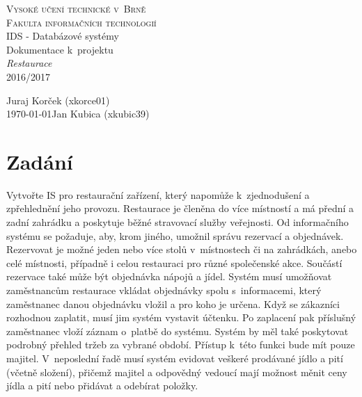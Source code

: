\documentclass[11pt, a4paper]{article}
\author{Jan Kubica, Juraj Korček}
\begin{document}
	\begin{titlepage}
		\begin{center}
			\textsc{\Huge Vysoké učení technické v~Brně} \\[8pt]
			\textsc{\huge Fakulta informačních technologií} \\[16pt]
			{\LARGE IDS - Databázové systémy} \\[6pt]
			{\huge Dokumentace k~projektu} \\
			{\Huge \emph{Restaurace}} \\
			{\Large 2016/2017}
		\end{center}
		
		{\Large \hfill Juraj Korček (xkorce01)} \\[8pt]
		{\Large \today \hfill Jan Kubica (xkubic39)}
		
	\end{titlepage}


\section{Zadání}

   Vytvořte IS pro restaurační zařízení, který napomůže k~zjednodušení a zpřehlednění
jeho provozu. Restaurace je členěna do více místností a má přední a zadní zahrádku
a poskytuje běžné stravovací služby veřejnosti. Od informačního systému se požaduje,
aby, krom jiného, umožnil správu rezervací a objednávek. Rezervovat je možné jeden
nebo více stolů v~místnostech či na zahrádkách, anebo celé místnosti, případně i celou
restauraci pro různé společenské akce. Součástí rezervace také může být objednávka
nápojů a jídel. Systém musí umožňovat zaměstnancům restaurace vkládat objednávky
spolu s~informacemi, který zaměstnanec danou objednávku vložil a pro koho je určena.
Když se zákazníci rozhodnou zaplatit, musí jim systém vystavit účtenku. Po zaplacení
pak příslušný zaměstnanec vloží záznam o~platbě do systému. Systém by měl také
poskytovat podrobný přehled tržeb za vybrané období. Přístup k~této funkci bude mít
pouze majitel. V~neposlední řadě musí systém evidovat veškeré prodávané jídlo a pití
(včetně složení), přičemž majitel a odpovědný vedoucí mají možnost měnit ceny jídla
a pití nebo přidávat a odebírat položky.
\end{document}
